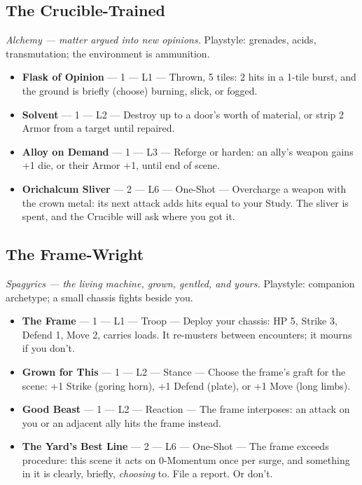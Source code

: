 \subsection{The Crucible-Trained}
\textit{Alchemy --- matter argued into new opinions.} Playstyle: grenades, acids, transmutation; the environment is ammunition.
\begin{itemize}
    \item \textbf{Flask of Opinion} --- 1 --- L1 --- Thrown, 5 tiles: 2 hits in a 1-tile burst, and the ground is briefly (choose) burning, slick, or fogged.
    \item \textbf{Solvent} --- 1 --- L2 --- Destroy up to a door's worth of material, or strip 2 Armor from a target until repaired.
    \item \textbf{Alloy on Demand} --- 1 --- L3 --- Reforge or harden: an ally's weapon gains +1 die, or their Armor +1, until end of scene.
    \item \textbf{Orichalcum Sliver} --- 2 --- L6 --- One-Shot --- Overcharge a weapon with the crown metal: its next attack adds hits equal to your Study. The sliver is spent, and the Crucible will ask where you got it.
\end{itemize}

\subsection{The Frame-Wright}
\textit{Spagyrics --- the living machine, grown, gentled, and yours.} Playstyle: companion archetype; a small chassis fights beside you.
\begin{itemize}
    \item \textbf{The Frame} --- 1 --- L1 --- Troop --- Deploy your chassis: HP 5, Strike 3, Defend 1, Move 2, carries loads. It re-musters between encounters; it mourns if you don't.
    \item \textbf{Grown for This} --- 1 --- L2 --- Stance --- Choose the frame's graft for the scene: +1 Strike (goring horn), +1 Defend (plate), or +1 Move (long limbs).
    \item \textbf{Good Beast} --- 1 --- L2 --- Reaction --- The frame interposes: an attack on you or an adjacent ally hits the frame instead.
    \item \textbf{The Yard's Best Line} --- 2 --- L6 --- One-Shot --- The frame exceeds procedure: this scene it acts on 0-Momentum once per surge, and something in it is clearly, briefly, \textit{choosing} to. File a report. Or don't.
\end{itemize}

